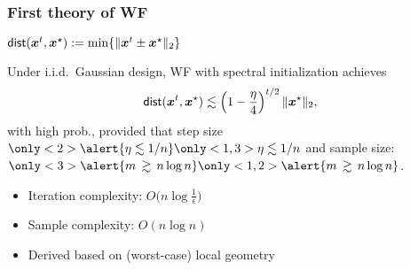 \documentclass[compress,
mathserif,wide,%
]{beamer}
\begin{document}
\begin{frame}
	\frametitle{First theory of WF}

	

 
\hfill $\mathsf{dist}(\bm{x}^t, \bm{x}^{\star}) := \min \{ \|\bm{x}^t \pm \bm{x}^{\star} \|_2 \}$


\begin{theorem}
Under i.i.d.~Gaussian design, WF with spectral initialization achieves
\[
	\mathsf{dist}(\bm{x}^t, \bm{x}^{\star}) \lesssim \left( 1 - \frac{\eta}{4} \right)^{t/2} \|\bm{x}^{\star} \|_2, 
\]
%
with high prob., 
	provided that step size $\only<2>{\alert{\eta \lesssim 1/n}}\only<1,3>{\eta \lesssim 1/n}$ and
	sample size: $ \only<3>{\alert{m\,\gtrsim\, n\log n}}\only<1,2>{\alert{m\,\gtrsim\, n\log n}} $.
\end{theorem}
%

%
\begin{itemize}
  \itemsep0.5em
  \item<2-> Iteration complexity:  $O\big(n \log\frac{1}{\epsilon}\big)$  
  \item<3-> Sample complexity: $O(n\log n)$
  \item<4-> Derived based on (worst-case) local geometry 
\end{itemize}

\end{frame}
\end{document}
